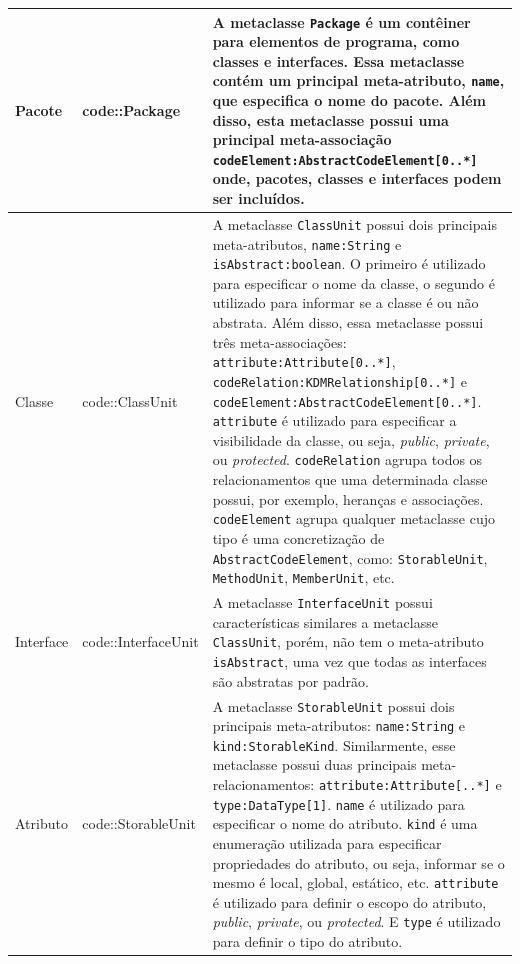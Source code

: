 \begin{longtable}[c]{| m{1.9cm} | m{3.57cm}| m{9.3cm} |}
 Pacote & code::Package & A metaclasse \texttt{Package} é um contêiner para elementos de programa, como classes e interfaces. Essa metaclasse contém um principal meta-atributo, \texttt{name}, que especifica o nome do pacote. Além disso, esta metaclasse possui uma principal meta-associação \texttt{codeElement:AbstractCodeElement[0..*]} onde, pacotes, classes e interfaces podem ser incluídos. \\ 
\hline
Classe & code::ClassUnit & A metaclasse \texttt{ClassUnit} possui dois principais meta-atributos,  \texttt{name:String} e \texttt{isAbstract:boolean}. O primeiro é utilizado para especificar o nome da classe, o segundo é utilizado para informar se a classe é ou não abstrata. Além disso, essa metaclasse possui três meta-associações: \texttt{attribute:Attribute[0..*]}, \texttt{codeRelation:KDMRelationship[0..*]} e  \texttt{codeElement:AbstractCodeElement[0..*]}. \texttt{attribute} é utilizado para especificar a  visibilidade da classe, ou seja, \textit{public}, \textit{private}, ou \textit{protected}. \texttt{codeRelation} agrupa todos os relacionamentos que uma determinada classe possui, por exemplo, heranças e associações. \texttt{codeElement} agrupa qualquer metaclasse cujo tipo é uma concretização de \texttt{AbstractCodeElement}, como: \texttt{StorableUnit}, \texttt{MethodUnit}, \texttt{MemberUnit}, etc. \\ 
\hline
Interface & code::InterfaceUnit & A metaclasse \texttt{InterfaceUnit} possui características similares a metaclasse \texttt{ClassUnit}, porém, não tem o meta-atributo \texttt{isAbstract}, uma vez que todas as interfaces são abstratas por padrão. \\ 
\hline
Atributo & code::StorableUnit & A metaclasse \texttt{StorableUnit} possui dois principais meta-atributos: \texttt{name:String} e \texttt{kind:StorableKind}. Similarmente, esse metaclasse possui duas principais meta-relacionamentos: \texttt{attribute:Attribute[..*]} e \texttt{type:DataType[1]}. \texttt{name} é utilizado para especificar o nome do atributo. \texttt{kind} é uma enumeração utilizada para especificar propriedades do atributo, ou seja, informar se o mesmo é local, global, estático, etc. \texttt{attribute} é utilizado para definir o escopo do atributo, \textit{public}, \textit{private}, ou \textit{protected}. E \texttt{type} é utilizado para definir o tipo do atributo.  \\ 
\hline

\end{longtable}
